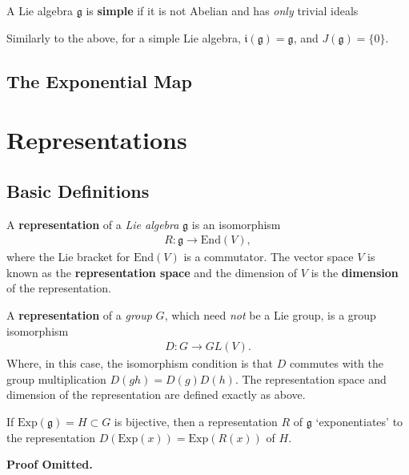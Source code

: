 \documentclass[11pt,fleqn]{article}
\renewenvironment{prop}{\begin{pBox}\begin{propT}}{\end{propT}\end{pBox}}
\begin{document}
\begin{definition}[Simple]
	A Lie algebra $\mathfrak{g} $ is \textbf{simple} if it is not Abelian and has \textit{only} trivial ideals
\end{definition}
\begin{remark}
	Similarly to the above, for a simple Lie algebra, $\mathfrak{i}(\mathfrak{g}) = \mathfrak{g}$, and $J(\mathfrak{g}) = \{0\}$.
\end{remark}

\subsection{The Exponential Map}

\section{Representations}

\subsection{Basic Definitions}

\begin{definition}
	A \textbf{representation} of a \textit{Lie algebra} $\mathfrak{g}$ is an isomorphism
		\begin{align}
			R : \mathfrak{g} \to \text{End}(V),
		\end{align}
	where the Lie bracket for $\text{End}(V)$ is a commutator. The vector space $V$ is known as the \textbf{representation space} and the dimension of $V$ is the \textbf{dimension} of the representation.
\end{definition}

\begin{definition}
	A \textbf{representation} of a \textit{group} $G$, which need \textit{not} be a Lie group, is a group isomorphism
		\begin{align}
			D: G \to GL(V).
		\end{align}
	Where, in this case, the isomorphism condition is that $D$ commutes with the group multiplication $D(g h) = D(g) D(h)$. The representation space and dimension of the representation are defined exactly as above.
\end{definition}

\begin{prop}
	If $\text{Exp}(\mathfrak{g}) = H \subset G$ is bijective, then a representation $R$ of $\mathfrak{g}$ `exponentiates' to the representation $D(\text{Exp}(x)) = \text{Exp}(R(x))$ of $H$.
\end{prop}
\textbf{Proof Omitted.}
\end{document}
